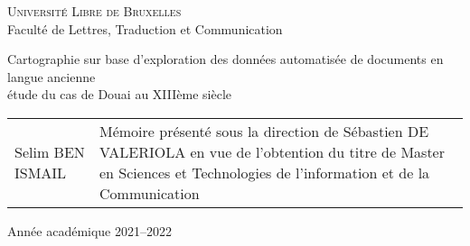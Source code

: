 
\begin{titlepage} %
\singlespacing %
\begin{center} 
\huge{\textsc{Université Libre de Bruxelles}}\\
\vspace{.5cm}
\LARGE{Faculté de Lettres, Traduction et Communication}
\end{center}

\vfill %

\begin{center}
\Huge{Cartographie sur base d’exploration des données automatisée de documents en langue ancienne}\\ %
\vspace{.5cm}
\LARGE{étude du cas de Douai au XIIIème siècle} %
\end{center}

\vfill

\begin{tabular}{b{5.5cm}b{7.5cm}} %
Selim \textsc{BEN ISMAIL} & Mémoire présenté sous la direction de Sébastien \textsc{DE VALERIOLA} en vue de l'obtention du titre de Master en Sciences et Technologies de l'information et de la Communication\\ %
\end{tabular}
\vfill
\begin{center}
Année académique 2021--2022 %
\end{center}
\end{titlepage}